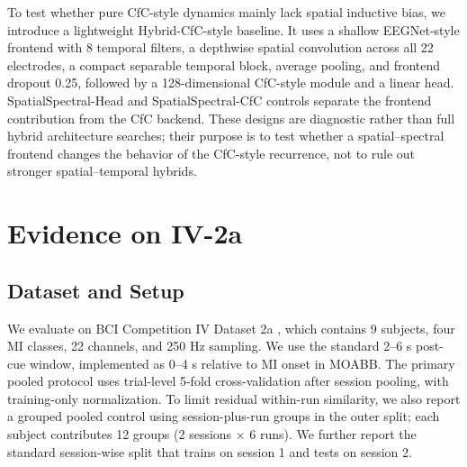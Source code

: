 \documentclass[journal]{IEEEtran}
\begin{document}
To test whether pure CfC-style dynamics mainly lack spatial inductive bias, we introduce a lightweight Hybrid-CfC-style baseline. It uses a shallow EEGNet-style frontend with 8 temporal filters, a depthwise spatial convolution across all 22 electrodes, a compact separable temporal block, average pooling, and frontend dropout 0.25, followed by a 128-dimensional CfC-style module and a linear head. SpatialSpectral-Head and SpatialSpectral-CfC controls separate the frontend contribution from the CfC backend. These designs are diagnostic rather than full hybrid architecture searches; their purpose is to test whether a spatial--spectral frontend changes the behavior of the CfC-style recurrence, not to rule out stronger spatial--temporal hybrids.

\section{Evidence on IV-2a}

\subsection{Dataset and Setup}
We evaluate on BCI Competition IV Dataset 2a \cite{tangermann2012bci4}, which contains 9 subjects, four MI classes, 22 channels, and 250 Hz sampling. We use the standard 2--6 s post-cue window, implemented as 0--4 s relative to MI onset in MOABB. The primary pooled protocol uses trial-level 5-fold cross-validation after session pooling, with training-only normalization. To limit residual within-run similarity, we also report a grouped pooled control using session-plus-run groups in the outer split; each subject contributes 12 groups (2 sessions $\times$ 6 runs). We further report the standard session-wise split that trains on session 1 and tests on session 2.
\end{document}
